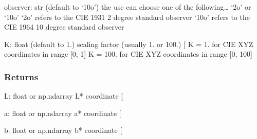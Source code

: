 \documentclass[letterpaper,10pt,english]{sphinxmanual}
\begin{document}
\begin{fulllineitems}
\sphinxAtStartPar
observer: str (default to ‘10o’)
the use can choose one of the following… ‘2o’ or ‘10o’
‘2o’ refers to the CIE 1931 2 degree standard observer
‘10o’ refers to the CIE 1964 10 degree standard observer

\sphinxAtStartPar
K: float (default to 1.)
scaling factor (usually 1. or 100.) {[}\sphinxhyphen{}{]}
K = 1. for CIE XYZ coordinates in range {[}0, 1{]}
K = 100. for CIE XYZ coordinates in range {[}0, 100{]}


\subsubsection{Returns}
\label{\detokenize{07_colors:id12}}
\sphinxAtStartPar
L: float or np.ndarray
L* coordinate {[}\sphinxhyphen{}{]}

\sphinxAtStartPar
a: float or np.ndarray
a* coordinate {[}\sphinxhyphen{}{]}

\sphinxAtStartPar
b: float or np.ndarray
b* coordinate {[}\sphinxhyphen{}{]}

\end{fulllineitems}

\end{document}
